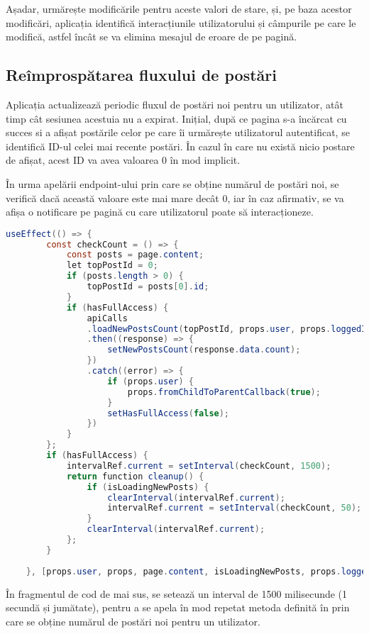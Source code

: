Așadar,  urmărește modificările pentru aceste valori de stare, și, pe baza acestor modificări, aplicația identifică interacțiunile utilizatorului și câmpurile pe care le modifică, astfel încât se va elimina mesajul de eroare de pe pagină.\newline

\subsection{Reîmprospătarea fluxului de postări}

Aplicația actualizează periodic fluxul de postări noi pentru un utilizator, atât timp cât sesiunea acestuia nu a expirat. Inițial, după ce pagina s-a încărcat cu succes si a afișat postările celor pe care îi urmărește utilizatorul autentificat, se identifică ID-ul celei mai recente postări. În cazul în care nu există nicio postare de afișat, acest ID va avea valoarea 0 în mod implicit.\newline

În urma apelării endpoint-ului prin care se obține numărul de postări noi, se verifică dacă această valoare este mai mare decât 0, iar în caz afirmativ, se va afișa o notificare pe pagină cu care utilizatorul poate să interacționeze.\newline

\begin{lstlisting}[language=Java]
	  useEffect(() => {
		const checkCount = () => {
			const posts = page.content;
			let topPostId = 0;
			if (posts.length > 0) {
				topPostId = posts[0].id;
			}
			if (hasFullAccess) {
				apiCalls
				.loadNewPostsCount(topPostId, props.user, props.loggedInUser.jwt)
				.then((response) => {
					setNewPostsCount(response.data.count);
				})
				.catch((error) => {
					if (props.user) {
						props.fromChildToParentCallback(true);
					}
					setHasFullAccess(false);
				})
			}
		};
		if (hasFullAccess) {
			intervalRef.current = setInterval(checkCount, 1500);
			return function cleanup() {
				if (isLoadingNewPosts) {
					clearInterval(intervalRef.current);
					intervalRef.current = setInterval(checkCount, 50);
				}
				clearInterval(intervalRef.current);
			};
		}
		
	}, [props.user, props, page.content, isLoadingNewPosts, props.loggedInUser, hasFullAccess]);
\end{lstlisting}
\bigskip

În fragmentul de cod de mai sus, se setează un interval de 1500 milisecunde (1 secundă și jumătate), pentru a se apela în mod repetat metoda definită în  prin care se obține numărul de postări noi pentru un utilizator.\newline


